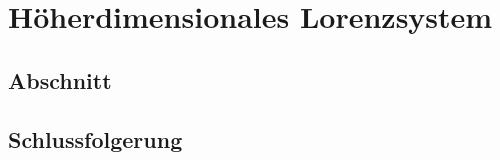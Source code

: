 %
%
%
\chapter{Höherdimensionales Lorenzsystem\label{chapter:lorenz2}}
\begin{refsection}

\section{Abschnitt}

\section{Schlussfolgerung}

\printbibliography[heading=subbibliography]
\end{refsection}
